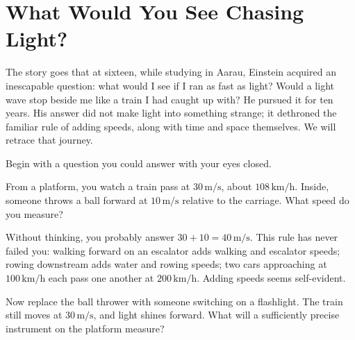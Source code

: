 \chapter{What Would You See Chasing Light?}

The story goes that at sixteen, while studying in Aarau, Einstein acquired an inescapable question: what would I see if I ran as fast as light? Would a light wave stop beside me like a train I had caught up with? He pursued it for ten years. His answer did not make light into something strange; it dethroned the familiar rule of adding speeds, along with time and space themselves. We will retrace that journey.


Begin with a question you could answer with your eyes closed.

From a platform, you watch a train pass at \(30\,\mathrm{m/s}\), about \(108\,\mathrm{km/h}\). Inside, someone throws a ball forward at \(10\,\mathrm{m/s}\) relative to the carriage. What speed do you measure?

\begin{center}
\end{center}

Without thinking, you probably answer \(30+10=40\,\mathrm{m/s}\). This rule has never failed you: walking forward on an escalator adds walking and escalator speeds; rowing downstream adds water and rowing speeds; two cars approaching at \(100\,\mathrm{km/h}\) each pass one another at \(200\,\mathrm{km/h}\). Adding speeds seems self-evident.

Now replace the ball thrower with someone switching on a flashlight. The train still moves at \(30\,\mathrm{m/s}\), and light shines forward. What will a sufficiently precise instrument on the platform measure?

